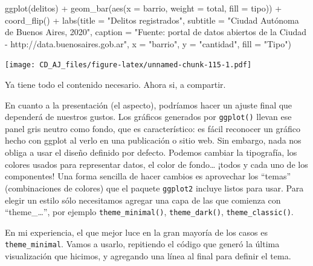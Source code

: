 \documentclass[
]{book}
\newenvironment{Shaded}{\begin{snugshade}}{\end{snugshade}}
\newcommand{\AttributeTok}[1]{\textcolor[rgb]{0.77,0.63,0.00}{#1}}
\newcommand{\FunctionTok}[1]{\textcolor[rgb]{0.00,0.00,0.00}{#1}}
\newcommand{\NormalTok}[1]{#1}
\newcommand{\SpecialCharTok}[1]{\textcolor[rgb]{0.00,0.00,0.00}{#1}}
\newcommand{\StringTok}[1]{\textcolor[rgb]{0.31,0.60,0.02}{#1}}
\begin{document}
\begin{Shaded}
\begin{Highlighting}[]
\FunctionTok{ggplot}\NormalTok{(delitos) }\SpecialCharTok{+}
    \FunctionTok{geom\_bar}\NormalTok{(}\FunctionTok{aes}\NormalTok{(}\AttributeTok{x =}\NormalTok{ barrio, }\AttributeTok{weight =}\NormalTok{ total, }\AttributeTok{fill =}\NormalTok{ tipo)) }\SpecialCharTok{+}
    \FunctionTok{coord\_flip}\NormalTok{() }\SpecialCharTok{+}
    \FunctionTok{labs}\NormalTok{(}\AttributeTok{title =} \StringTok{"Delitos registrados"}\NormalTok{,}
         \AttributeTok{subtitle =} \StringTok{"Ciudad Autónoma de Buenos Aires, 2020"}\NormalTok{,}
         \AttributeTok{caption =} \StringTok{"Fuente: portal de datos abiertos de la Ciudad {-} http://data.buenosaires.gob.ar"}\NormalTok{,}
         \AttributeTok{x =} \StringTok{"barrio"}\NormalTok{,}
         \AttributeTok{y =} \StringTok{"cantidad"}\NormalTok{,}
         \AttributeTok{fill =} \StringTok{"Tipo"}\NormalTok{)}
\end{Highlighting}
\end{Shaded}

\texttt{[image: CD\_AJ\_files/figure-latex/unnamed-chunk-115-1.pdf]}

Ya tiene todo el contenido necesario. Ahora si, a compartir.

En cuanto a la presentación (el aspecto), podríamos hacer un ajuste final que dependerá de nuestros gustos. Los gráficos generados por \texttt{ggplot()} llevan ese panel gris neutro como fondo, que es característico: es fácil reconocer un gráfico hecho con ggplot al verlo en una publicación o sitio web. Sin embargo, nada nos obliga a usar el diseño definido por defecto. Podemos cambiar la tipografía, los colores usados para representar datos, el color de fondo\ldots{} ¡todos y cada uno de los componentes! Una forma sencilla de hacer cambios es aprovechar los ``temas'' (combinaciones de colores) que el paquete \texttt{ggplot2} incluye listos para usar. Para elegir un estilo sólo necesitamos agregar una capa de las que comienza con ``theme\_\ldots{}'', por ejemplo \texttt{theme\_minimal()}, \texttt{theme\_dark()}, \texttt{theme\_classic()}.

En mi experiencia, el que mejor luce en la gran mayoría de los casos es \texttt{theme\_minimal}. Vamos a usarlo, repitiendo el código que generó la última visualización que hicimos, y agregando una línea al final para definir el tema.
\end{document}
